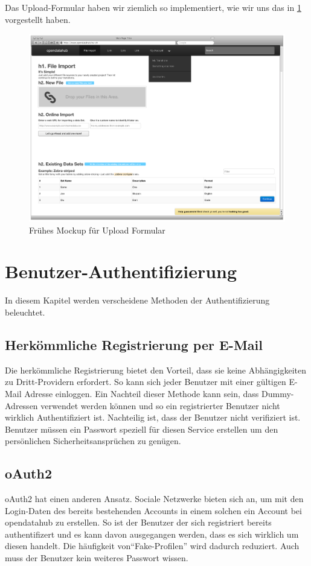 Das Upload-Formular haben wir ziemlich so implementiert, wie wir uns das in \cref{fig:pd:wireframe-upload} vorgestellt haben.
\begin{figure}[H]
    \centering
    \includegraphics[width=0.8\linewidth]{fig/Wireframes-Upload}
    \caption{Frühes Mockup für Upload Formular}
    \label{fig:pd:wireframe-upload}
\end{figure}

\section{Benutzer-Authentifizierung}
In diesem Kapitel werden verscheidene Methoden der Authentifizierung beleuchtet.
\subsection{Herkömmliche Registrierung per E-Mail}
Die herkömmliche Registrierung bietet den Vorteil, dass sie keine Abhängigkeiten zu Dritt-Providern erfordert. So kann sich jeder Benutzer mit einer gültigen E-Mail Adresse einloggen. Ein Nachteil dieser Methode kann sein, dass Dummy-Adressen verwendet werden können und so ein registrierter Benutzer nicht wirklich Authentifiziert ist. Nachteilig ist, dass der Benutzer nicht verifiziert ist. Benutzer müssen ein Passwort speziell für diesen Service erstellen um den persönlichen Sicherheitsansprüchen zu genügen.
\subsection{oAuth2}
oAuth2 hat einen anderen Ansatz. Sociale Netzwerke bieten sich an, um mit den Login-Daten des bereits bestehenden Accounts in einem solchen ein Account bei opendatahub zu erstellen. So ist der Benutzer der sich registriert bereits authentifizert und es kann davon ausgegangen werden, dass es sich wirklich um diesen handelt. Die häufigkeit von``Fake-Profilen'' wird dadurch reduziert. Auch muss der Benutzer kein weiteres Passwort wissen.
